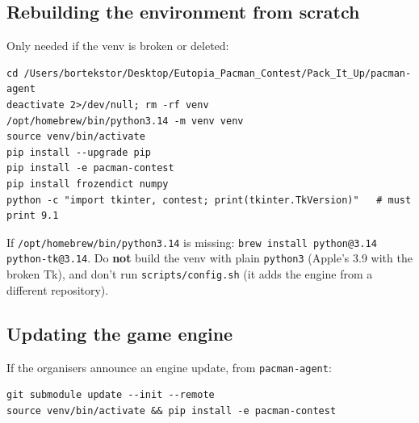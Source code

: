 \documentclass[11pt,a4paper]{article}
\newcommand{\p}[1]{\nolinkurl{#1}}  %
\begin{document}
\subsection{Rebuilding the environment from scratch}\label{sec:rebuild}
Only needed if the venv is broken or deleted:
\begin{lstlisting}
cd /Users/bortekstor/Desktop/Eutopia_Pacman_Contest/Pack_It_Up/pacman-agent
deactivate 2>/dev/null; rm -rf venv
/opt/homebrew/bin/python3.14 -m venv venv
source venv/bin/activate
pip install --upgrade pip
pip install -e pacman-contest
pip install frozendict numpy
python -c "import tkinter, contest; print(tkinter.TkVersion)"   # must print 9.1
\end{lstlisting}
If \texttt{/opt/homebrew/bin/python3.14} is missing: \p{brew install python@3.14 python-tk@3.14}.
Do \textbf{not} build the venv with plain \texttt{python3} (Apple's 3.9 with the broken Tk), and don't run \texttt{scripts/config.sh}
(it adds the engine from a different repository).

\subsection{Updating the game engine}
If the organisers announce an engine update, from \texttt{pacman-agent}:
\begin{lstlisting}
git submodule update --init --remote
source venv/bin/activate && pip install -e pacman-contest
\end{lstlisting}
\end{document}
